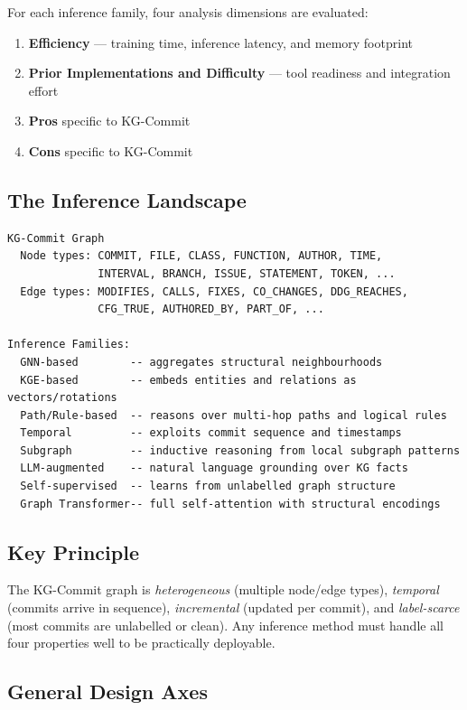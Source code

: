 \documentclass[12pt,a4paper]{article}
\begin{document}
For each inference family, four analysis dimensions are evaluated:

\begin{enumerate}[noitemsep]
  \item \textbf{Efficiency} --- training time, inference latency, and memory footprint
  \item \textbf{Prior Implementations and Difficulty} --- tool readiness and integration effort
  \item \textbf{Pros} specific to KG-Commit
  \item \textbf{Cons} specific to KG-Commit
\end{enumerate}

\subsection{The Inference Landscape}

\begin{lstlisting}
KG-Commit Graph
  Node types: COMMIT, FILE, CLASS, FUNCTION, AUTHOR, TIME,
              INTERVAL, BRANCH, ISSUE, STATEMENT, TOKEN, ...
  Edge types: MODIFIES, CALLS, FIXES, CO_CHANGES, DDG_REACHES,
              CFG_TRUE, AUTHORED_BY, PART_OF, ...

Inference Families:
  GNN-based        -- aggregates structural neighbourhoods
  KGE-based        -- embeds entities and relations as vectors/rotations
  Path/Rule-based  -- reasons over multi-hop paths and logical rules
  Temporal         -- exploits commit sequence and timestamps
  Subgraph         -- inductive reasoning from local subgraph patterns
  LLM-augmented    -- natural language grounding over KG facts
  Self-supervised  -- learns from unlabelled graph structure
  Graph Transformer-- full self-attention with structural encodings
\end{lstlisting}

\subsection{Key Principle}

The KG-Commit graph is \emph{heterogeneous} (multiple node/edge types),
\emph{temporal} (commits arrive in sequence), \emph{incremental} (updated
per commit), and \emph{label-scarce} (most commits are unlabelled or clean).
Any inference method must handle all four properties well to be practically
deployable.

\subsection{General Design Axes}
\end{document}
